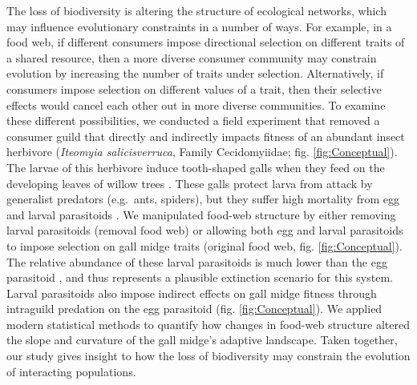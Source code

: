 \documentclass[11pt,]{article}
\begin{document}
The loss of biodiversity is altering the structure of ecological
networks, which may influence evolutionary constraints in a number of
ways. For example, in a food web, if different consumers impose
directional selection on different traits of a shared resource, then a
more diverse consumer community may constrain evolution by increasing
the number of traits under selection. Alternatively, if consumers impose
selection on different values of a trait, then their selective effects
would cancel each other out in more diverse communities. To examine
these different possibilities, we conducted a field experiment that
removed a consumer guild that directly and indirectly impacts fitness of
an abundant insect herbivore (\emph{Iteomyia salicisverruca}, Family
Cecidomyiidae; fig. \ref{fig:Conceptual}). The larvae of this herbivore
induce tooth-shaped galls when they feed on the developing leaves of
willow trees \citep[\emph{Salix} sp.,][]{Russo2006}. These galls protect
larva from attack by generalist predators (e.g.~ants, spiders), but they
suffer high mortality from egg and larval parasitoids
\citep{Barbour2016}. We manipulated food-web structure by either
removing larval parasitoids (removal food web) or allowing both egg and
larval parasitoids to impose selection on gall midge traits (original
food web, fig. \ref{fig:Conceptual}). The relative abundance of these
larval parasitoids is much lower than the egg parasitoid
\citep{Barbour2016}, and thus represents a plausible extinction scenario
for this system. Larval parasitoids also impose indirect effects on gall
midge fitness through intraguild predation on the egg parasitoid (fig.
\ref{fig:Conceptual}). We applied modern statistical methods to quantify
how changes in food-web structure altered the slope and curvature of the
gall midge's adaptive landscape. Taken together, our study gives insight
to how the loss of biodiversity may constrain the evolution of
interacting populations.
\end{document}
